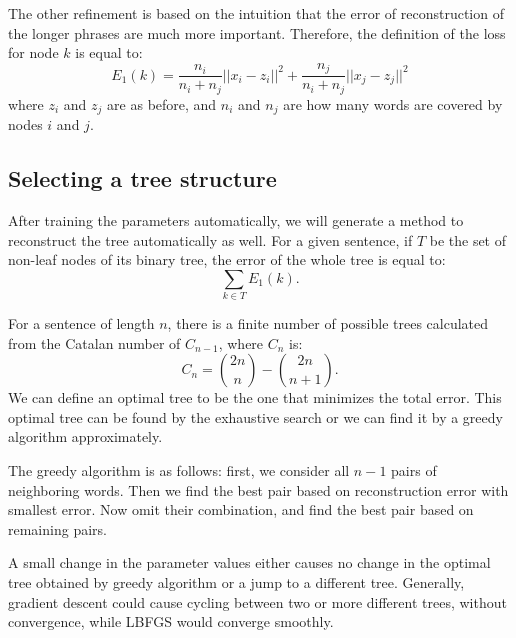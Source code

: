 \documentclass[twoside,12pt]{article}
\begin{document}
The other refinement is based on the intuition that the error of reconstruction of the longer phrases are much more important. Therefore, the definition of the loss for node $k$ is equal to:
\begin{equation}
E_1(k)=\frac{n_i}{n_i+n_j}||x_i-z_i||^2+\frac{n_j}{n_i+n_j}||x_j-z_j||^2
\end{equation}
where $z_i$ and $z_j$ are as before, and $n_i$ and $n_j$ are how many words are covered by nodes $i$ and $j$.
\subsection{ Selecting a tree structure}
After training the parameters automatically, we will generate a method to reconstruct the tree automatically as well. For a given sentence, if $T$ be the set of non-leaf nodes of its binary tree, the error of the whole tree is equal to:
\begin{equation}
\sum_{k \in T}E_1(k).
\end{equation}

For a sentence of length $n$, there is a finite number of possible trees calculated from the Catalan number of $C_{n-1}$, where $C_n$ is:
\begin{equation}
C_n= {2n \choose n} -{ 2n\choose n+1}.
\end{equation}
We can define an optimal tree to be the one that minimizes the total error. This optimal tree can be found by the exhaustive search or we can find it by a greedy algorithm approximately. 

The greedy algorithm is as follows: first, we consider all $n-1$ pairs of neighboring words. Then we find the best pair based on reconstruction error with smallest error. Now omit their combination, and find the best pair based on remaining pairs. 

A small change in the parameter values either causes no change in the optimal tree obtained by greedy algorithm or a jump to a different tree. Generally, gradient descent could cause cycling between two or more different trees, without convergence, while LBFGS would converge smoothly.
\end{document}
